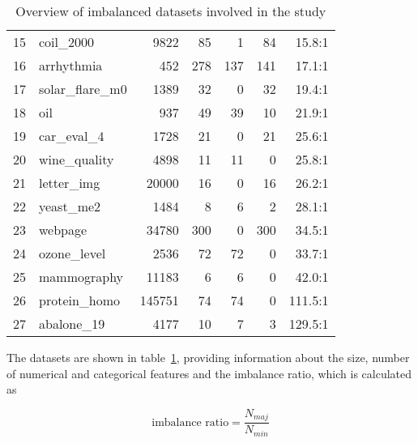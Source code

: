 \begin{table}
\begin{tabular}{llrrrrr}
        15 &      coil\_2000 &    9822 &        85 &                   1 &                    84 &          15.8:1 \\
        16 &     arrhythmia &     452 &       278 &                 137 &                   141 &          17.1:1 \\
        17 & solar\_flare\_m0 &    1389 &        32 &                   0 &                    32 &          19.4:1 \\
        18 &            oil &     937 &        49 &                  39 &                    10 &          21.9:1 \\
        19 &     car\_eval\_4 &    1728 &        21 &                   0 &                    21 &          25.6:1 \\
        20 &   wine\_quality &    4898 &        11 &                  11 &                     0 &          25.8:1 \\
        21 &     letter\_img &   20000 &        16 &                   0 &                    16 &          26.2:1 \\
        22 &      yeast\_me2 &    1484 &         8 &                   6 &                     2 &          28.1:1 \\
        23 &        webpage &   34780 &       300 &                   0 &                   300 &          34.5:1 \\
        24 &    ozone\_level &    2536 &        72 &                  72 &                     0 &          33.7:1 \\
        25 &    mammography &   11183 &         6 &                   6 &                     0 &          42.0:1 \\
        26 &   protein\_homo &  145751 &        74 &                  74 &                     0 &         111.5:1 \\
        27 &     abalone\_19 &    4177 &        10 &                   7 &                     3 &         129.5:1 \\
        \bottomrule
        \end{tabular}
    \caption{Overview of imbalanced datasets involved in the study}
    \label{tab:df_info}
\end{table}

The datasets are shown in table~\ref{tab:df_info}, providing information about the size, number of numerical and categorical features and the imbalance ratio, which is calculated as

\begin{equation}
    \text{imbalance ratio} = \frac{N_{maj}}{N_{min}}
\end{equation}


